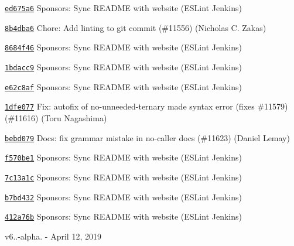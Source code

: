 \begin{DoxyItemize}
\item \href{https://github.com/eslint/eslint/commit/ed675a6e5ac42898555c51a7cf771b79695ba591}{\texttt{ {\ttfamily ed675a6}}} Sponsors\+: Sync README with website (ESLint Jenkins)
\item \href{https://github.com/eslint/eslint/commit/8b4dba606f8306f8ad0a37e2174a6e3236f7ebe7}{\texttt{ {\ttfamily 8b4dba6}}} Chore\+: Add linting to git commit (\#11556) (Nicholas C. Zakas)
\item \href{https://github.com/eslint/eslint/commit/8684f4646da33bfe81e8f7f8c2d1af8b31065564}{\texttt{ {\ttfamily 8684f46}}} Sponsors\+: Sync README with website (ESLint Jenkins)
\item \href{https://github.com/eslint/eslint/commit/1bdacc9b703158d5ca3563e4a9b67bb8453ac316}{\texttt{ {\ttfamily 1bdacc9}}} Sponsors\+: Sync README with website (ESLint Jenkins)
\item \href{https://github.com/eslint/eslint/commit/e62c8af6a86e35dc05f30713faf87a18cc77714d}{\texttt{ {\ttfamily e62c8af}}} Sponsors\+: Sync README with website (ESLint Jenkins)
\item \href{https://github.com/eslint/eslint/commit/1dfe077b7e47c6090277eb984e08bd472bb5595e}{\texttt{ {\ttfamily 1dfe077}}} Fix\+: autofix of no-\/unneeded-\/ternary made syntax error (fixes \#11579) (\#11616) (Toru Nagashima)
\item \href{https://github.com/eslint/eslint/commit/bebd0793eaf122b013cca501ff2c6b0fc05d5493}{\texttt{ {\ttfamily bebd079}}} Docs\+: fix grammar mistake in no-\/caller docs (\#11623) (Daniel Lemay)
\item \href{https://github.com/eslint/eslint/commit/f570be17b339cb7622c512331b1653013279855a}{\texttt{ {\ttfamily f570be1}}} Sponsors\+: Sync README with website (ESLint Jenkins)
\item \href{https://github.com/eslint/eslint/commit/7c13a1c144a6a7c99cd9338a24166da9f7439cd0}{\texttt{ {\ttfamily 7c13a1c}}} Sponsors\+: Sync README with website (ESLint Jenkins)
\item \href{https://github.com/eslint/eslint/commit/b7bd432e1161feba8dbb81f62cf03cafad42c3d4}{\texttt{ {\ttfamily b7bd432}}} Sponsors\+: Sync README with website (ESLint Jenkins)
\item \href{https://github.com/eslint/eslint/commit/412a76b316e05ca85334c1d6bc6372df536da2db}{\texttt{ {\ttfamily 412a76b}}} Sponsors\+: Sync README with website (ESLint Jenkins)
\end{DoxyItemize}

v6..-\/alpha. -\/ April 12, 2019


